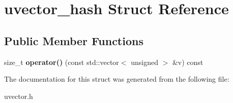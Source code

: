 \hypertarget{structuvector__hash}{}\section{uvector\+\_\+hash Struct Reference}
\label{structuvector__hash}
\subsection*{Public Member Functions}
\begin{DoxyCompactItemize}
\item 
\mbox{\label{structuvector__hash_a73e5b313f892d888f72b82ef9e2f7bbf}} 
size\+\_\+t {\bfseries operator()} (const std\+::vector$<$ unsigned $>$ \&v) const
\end{DoxyCompactItemize}


The documentation for this struct was generated from the following file\+:\begin{DoxyCompactItemize}
\item 
uvector.\+h\end{DoxyCompactItemize}
